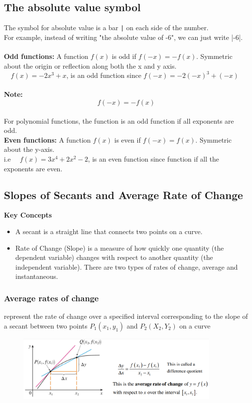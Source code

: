 \documentclass{article}
\begin{document}
\subsection*{The absolute value symbol}
The symbol for absolute value is a bar \texttt{|} on each side of the number. \\
For example, instead of writing
"the absolute value of -6", we can just write |-6|. \\\\
\textbf{Odd functions:} A function $f(x)$ is odd if $f(-x)= -f(x)$. Symmetric about the origin or reflection along both the x and y axis. \\ 
$\quad f(x)=-2x^3+x$, is an odd function since $f(-x)=-2(-x)^3+(-x)$ \\  \\
\textbf{Note:}$$f(-x)=-f(x)$$ \\ 
For polynomial functions, the function is an odd function if all exponents are odd. \\ 
\textbf{Even functions:} A function $f(x)$ is even if $f(-x)=f(x)$. Symmetric about the y-axis. \\ 
i.e $\quad f(x)=3x^4+2x^2-2$, is an even function since function if all the exponents are even. \\ 
\newpage 
\subsection{Slopes of Secants and Average Rate of Change}
\textbf{Key Concepts}

\begin{itemize}
    \item A secant is a straight line that connects two points on a curve.
    \item Rate of Change (Slope) is a measure of how quickly one quantity (the dependent variable) changes with respect to another quantity (the independent variable).
There are two types of rates of change, average and instantaneous.
\end{itemize}



\subsubsection{Average rates of change}
    represent the rate of change over a specified interval corresponding to the slope of a secant between two points $P_1 (x_1, y_1)$ and $P_2(X_2,Y_2)$ on a curve
\begin{figure}[h]
    \centering
    \includegraphics[width=0.9\textwidth]{imgs/Slopes of Secants and Average Rate of Change.png}
    \end{figure}
    
\end{document}
